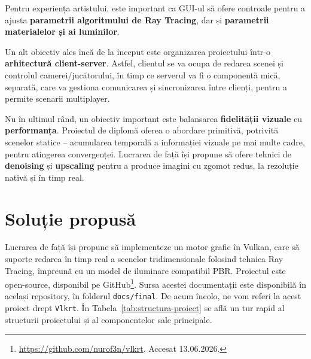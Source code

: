 \documentclass[12pt,a4paper]{report}
\numberwithin{equation}{section} %
\begin{document}
Pentru experiența artistului, este important ca GUI-ul să ofere controale pentru a ajusta \textbf{parametrii algoritmului de Ray Tracing}, dar și \textbf{parametrii materialelor și ai luminilor}.

Un alt obiectiv ales încă de la început este organizarea proiectului într-o \textbf{arhitectură client-server}.
Astfel, clientul se va ocupa de redarea scenei și controlul camerei/jucătorului, în timp ce serverul va fi o componentă mică, separată, care va gestiona comunicarea și sincronizarea între clienți, pentru a permite scenarii multiplayer.

Nu în ultimul rând, un obiectiv important este balansarea \textbf{fidelității vizuale} cu \textbf{performanța}.
Proiectul de diplomă oferea o abordare primitivă, potrivită scenelor statice -- acumularea temporală a informației vizuale pe mai multe cadre, pentru atingerea convergenței.
Lucrarea de față își propune să ofere tehnici de \textbf{denoising} și \textbf{upscaling} pentru a produce imagini cu zgomot redus, la rezoluție nativă și în timp real.

\section{Soluție propusă}

Lucrarea de față își propune să implementeze un motor grafic în Vulkan, care să suporte redarea în timp real a scenelor tridimensionale folosind tehnica Ray Tracing, împreună cu un model de iluminare compatibil PBR.
Proiectul este open-source, disponibil pe GitHub\footnote{\url{https://github.com/nurof3n/vlkrt}. Accesat 13.06.2026.}.
Sursa acestei documentații este disponibilă în același repository, în folderul \texttt{docs/final}.
De acum încolo, ne vom referi la acest proiect drept \texttt{Vlkrt}.
În Tabela~\ref{tab:structura-proiect} se află un tur rapid al structurii proiectului și al componentelor sale principale.
\end{document}
